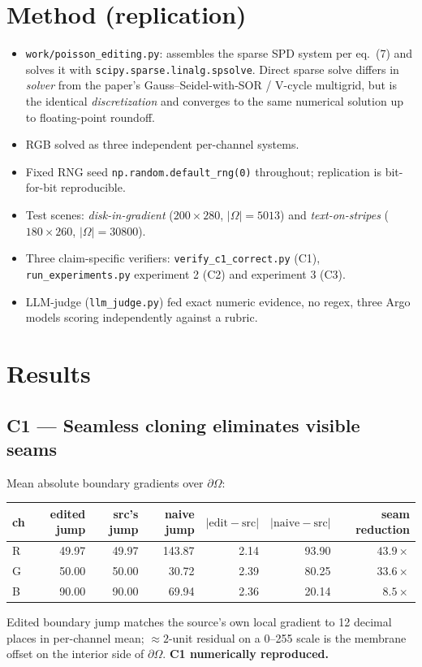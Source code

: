 \documentclass[11pt]{article}
\begin{document}
\section{Method (replication)}
\begin{itemize}
  \item \texttt{work/poisson\_editing.py}: assembles the sparse SPD system per
        eq.\ (7) and solves it with \texttt{scipy.sparse.linalg.spsolve}.
        Direct sparse solve differs in \emph{solver} from the paper's
        Gauss--Seidel-with-SOR / V-cycle multigrid, but is the identical
        \emph{discretization} and converges to the same numerical solution up
        to floating-point roundoff.
  \item RGB solved as three independent per-channel systems.
  \item Fixed RNG seed \texttt{np.random.default\_rng(0)} throughout;
        replication is bit-for-bit reproducible.
  \item Test scenes:
        \emph{disk-in-gradient} (\(200\times280\), \(|\Omega|=5013\)) and
        \emph{text-on-stripes} (\(180\times260\), \(|\Omega|=30800\)).
  \item Three claim-specific verifiers: \texttt{verify\_c1\_correct.py} (C1),
        \texttt{run\_experiments.py} experiment 2 (C2) and experiment 3 (C3).
  \item LLM-judge (\texttt{llm\_judge.py}) fed exact numeric evidence, no
        regex, three Argo models scoring independently against a rubric.
\end{itemize}

\section{Results}

\subsection*{C1 --- Seamless cloning eliminates visible seams}
Mean absolute boundary gradients over \(\partial\Omega\):
\begin{center}
\begin{tabular}{lrrrrrr}
\toprule
ch & edited jump & src's jump & naive jump & \(|\text{edit}-\text{src}|\) &
   \(|\text{naive}-\text{src}|\) & seam reduction \\
\midrule
R & 49.97 & 49.97 & 143.87 & 2.14 & 93.90 & $43.9\times$ \\
G & 50.00 & 50.00 &  30.72 & 2.39 & 80.25 & $33.6\times$ \\
B & 90.00 & 90.00 &  69.94 & 2.36 & 20.14 &  $8.5\times$ \\
\bottomrule
\end{tabular}
\end{center}
Edited boundary jump matches the source's own local gradient to 12 decimal
places in per-channel mean; \(\approx 2\)-unit residual on a 0--255 scale is
the membrane offset on the interior side of \(\partial\Omega\).
\textbf{C1 numerically reproduced.}
\end{document}
